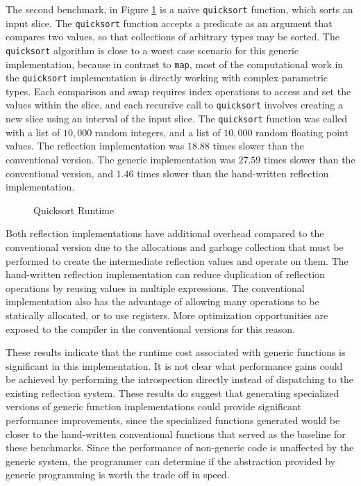 \documentclass[letterpaper,twocolumn,11pt]{article}
\begin{document}
The second benchmark, in Figure \ref{fig:quicksort} is a naive \texttt{quicksort} function, which sorts an input slice. The \texttt{quicksort} function accepts a predicate as an argument that compares two values, so that collections of arbitrary types may be sorted. The \texttt{quicksort} algorithm is close to a worst case scenario for this generic implementation, because in contrast to \texttt{map}, most of the computational work in the \texttt{quicksort} implementation is directly working with complex parametric types. Each comparison and swap requires index operations to access and set the values within the slice, and each recursive call to \texttt{quicksort} involves creating a new slice using an interval of the input slice. The \texttt{quicksort} function was called with a list of $10,000$ random integers, and a list of $10,000$ random floating point values. The reflection implementation was $18.88$ times slower than the conventional version. The generic implementation was $27.59$ times slower than the conventional version, and $1.46$ times slower than the hand-written reflection implementation.

\begin{figure}
    \caption{Quicksort Runtime\label{fig:quicksort}}
    \centering
    
\end{figure}

Both reflection implementations have additional overhead compared to the conventional version due to the allocations and garbage collection that must be performed to create the intermediate reflection values and operate on them. The hand-written reflection implementation can reduce duplication of reflection operations by reusing values in multiple expressions. The conventional implementation also has the advantage of allowing many operations to be statically allocated, or to use registers. More optimization opportunities are exposed to the compiler in the conventional versions for this reason.

These results indicate that the runtime cost associated with generic functions is significant in this implementation. It is not clear what performance gains could be achieved by performing the introspection directly instead of dispatching to the existing reflection system. These results do suggest that generating specialized versions of generic function implementations could provide significant performance improvements, since the specialized functions generated would be closer to the hand-written conventional functions that served as the baseline for these benchmarks. Since the performance of non-generic code is unaffected by the generic system, the programmer can determine if the abstraction provided by generic programming is worth the trade off in speed.
\end{document}
